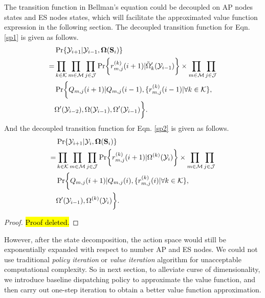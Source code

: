 \begin{lemma}
    The transition function in Bellman's equation could be decoupled on AP nodes states and ES nodes states, which will facilitate the approximated value function expression in the following section.
    The decoupled transition function for Eqn. \ref{sp1} is given as follows.
    \begin{align}
        & \Pr\{\Obsv_{i+1}|\Obsv_{i-1}, \Policy(\Stat_{i})\}
        \nonumber\\
        =& \prod_{k\in\apSet}\prod_{m\in\esSet}\prod_{j\in\jSpace}
                \Pr\Brace{r^{(k)}_{m,j}(i+1)|\tilde{\Omega}'_k(\Obsv_{i-1})}
                \times \prod_{m\in\esSet}\prod_{j\in\jSpace}
            \nonumber\\
            & \Pr\Brace{Q_{m,j}(i+1)|Q_{m,j}(i-1), \set{r^{(k)}_{m,j}(i-1)|\forall k\in\apSet},
            \nonumber\\
            & \Omega'(\Obsv_{i-2}), \Omega(\Obsv_{i-1}), \Omega'(\Obsv_{i-1})}.
    \end{align}
    And the decoupled transition function for Eqn. \ref{sp2} is given as follows.
    \begin{align}
        & \Pr\{\Obsv_{i+1}|\Obsv_{i}, \Policy(\Stat_{i})\}
        \nonumber\\
        =& \prod_{k\in\apSet}\prod_{m\in\esSet}\prod_{j\in\jSpace}
                \Pr\Brace{ r^{(k)}_{m,j}(i+1) | \Omega^{(k)}(\Obsv_i) }
                \times \prod_{m\in\esSet}\prod_{j\in\jSpace}
            \nonumber\\
            & \Pr\Brace{Q_{m,j}(i+1)|Q_{m,j}(i), \set{r^{(k)}_{m,j}(i)|\forall k\in\apSet},
            \nonumber\\
            & \Omega'(\Obsv_{i-1}), \Omega^{(k)}(\Obsv_{i})}.
    \end{align}
\end{lemma}
\begin{proof}
    \hl{Proof deleted.}
\end{proof}

However, after the state decomposition, the action space would still be exponentially expanded with respect to number AP and ES nodes. We could not use traditional \emph{policy iteration} or \emph{value iteration} algorithm \cite{sutton1998introduction} for unacceptable computational complexity.
So in next section, to alleviate curse of dimensionality, we introduce baseline dispatching policy to approximate the value function, and then carry out one-step iteration to obtain a better value function approximation.
